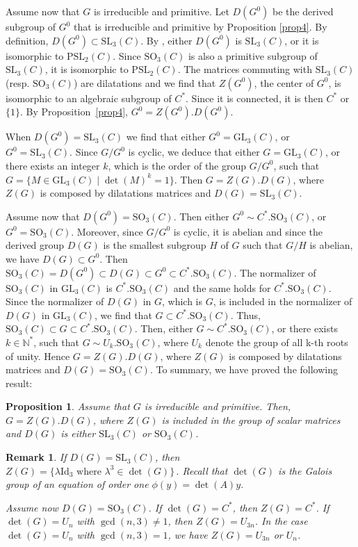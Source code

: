 \documentclass[a4paper,11pt]{amsart}
\newcommand{\GL}{\operatorname{GL}}
\newtheorem{rem}[thm]{Remark}
\newtheorem{prop}[thm]{Proposition}
\def\GL{\mathrm{GL}}
\def\N{\mathbb{N}}
\begin{document}
Assume now that $G$ is irreducible and primitive.  Let $D(G^0)$ be the derived subgroup of $G^0$ that is irreducible and primitive by Proposition \ref{prop4}. By definition, $D(G^0)\subset \mathrm{SL}_{3}(C)$.   By \cite[Section 2.2]{singer1993galois}, either $D(G^0)$ is $\mathrm{SL}_3(C)$, or it is isomorphic to $\mathrm{PSL}_2(C)$.  Since $\mathrm{SO}_3(C)$ is also a primitive subgroup of  $\mathrm{SL}_3(C)$,  it is isomorphic to $\mathrm{PSL}_2(C)$.  
The matrices commuting with   $\mathrm{SL}_3(C)$  (resp. $\mathrm{SO}_3(C)$)  are dilatations and we find that $Z(G^0)$, the center of $G^0$, is isomorphic to an algebraic subgroup of  $C^*$.  Since it is connected, it is then $C^*$ or $\{1\}$. By Proposition~\ref{prop4}, $G^0=Z(G^0).D(G^0)$.  \par 
When $D(G^0)=\mathrm{SL}_3(C)$ we find that either $G^0=\mathrm{GL}_3(C)$, or 
$G^0=\mathrm{SL}_3(C)$. Since $G/G^0$ is cyclic, we deduce that  either $G=\mathrm{GL}_3(C)$, or there exists an integer $k$, which is the order of the group $G/G^0$, such that 
$G=\lbrace M\in\GL_3\left( C\right) \mid \det(M)^{k}=1 \rbrace $. Then $G=Z(G).D(G)$, where $Z(G)$ is composed by dilatations matrices and $D(G)=\mathrm{SL}_3(C)$.\par 
Assume now that $D(G^0)=\mathrm{SO}_3(C)$. Then  either $G^0 \sim C^* .\mathrm{SO}_3(C)$, or $G^0=\mathrm{SO}_3(C)$. Moreover, since $G/G^0$ is cyclic, it is abelian and since the derived group $D(G)$ is the smallest subgroup $H$ of $G$ such that $G/H$ is abelian, we have $D(G)\subset G^0$.
Then $\mathrm{SO}_3(C)=D(G^0)\subset D(G)\subset G^0 \subset C^*. \mathrm{SO}_3(C)$. The normalizer of $\mathrm{SO}_3(C)$ in $\mathrm{GL}_3(C)$ is $C^* . \mathrm{SO}_3(C)$ and the same holds for $C^*. \mathrm{SO}_3(C)$. Since the normalizer of $D(G)$ in $G$, which is $G$, is included in the normalizer of $D(G)$ in $\GL_3(C)$, we find that $G\subset C^*. \mathrm{SO}_3(C)$. Thus, $\mathrm{SO}_3(C)\subset G\subset C^*. \mathrm{SO}_3(C)$.
 Then, either $G\sim C^*. \mathrm{SO}_3(C)$, or there exists $k\in \N^*$, such that $G\sim U_k .\mathrm{SO}_3(C)$, where $U_k$ denote the group of all k-th roots of unity. Hence $G=Z(G).D(G)$, where $Z(G)$ is composed by dilatations matrices and $D(G)=\mathrm{SO}_3(C)$.
 To summary, we have proved the following result:
 \begin{prop}\label{prop5}
 Assume that $G$ is irreducible and primitive. Then, $G=Z(G).D(G)$, where $Z(G)$ is included in the group of scalar matrices and $D(G)$ is either $\mathrm{SL}_3(C)$ or $\mathrm{SO}_3(C)$. 
 \end{prop}
\begin{rem}
If $D(G)=\mathrm{SL}_3(C)$, then
$ 
Z(G) = \lbrace\lambda \mathrm{Id}_3  \text{ where } \lambda^3\in \det(G) \rbrace\, .
$
Recall that  $\det(G)$ is the Galois group of an equation of order one $\phi (y)=\det (A)y$. 

Assume now $D(G)=\mathrm{SO}_3(C)$. If $\det(G)=C^*$, then $Z(G) = C^*$. If $\det(G)=U_n$ with $\gcd(n,3)\neq 1$, then $Z(G)=U_{3n}$. In the case $\det(G)=U_n$ with $\gcd(n,3)= 1$, we have $Z(G)=U_{3n}$ or $U_n$.
\end{rem}
\end{document}

